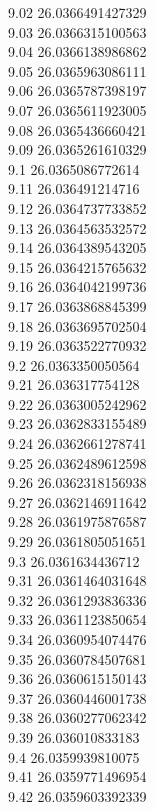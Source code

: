 {9.02	26.0366491427329\\
9.03	26.0366315100563\\
9.04	26.0366138986862\\
9.05	26.0365963086111\\
9.06	26.0365787398197\\
9.07	26.0365611923005\\
9.08	26.0365436660421\\
9.09	26.0365261610329\\
9.1	26.0365086772614\\
9.11	26.036491214716\\
9.12	26.0364737733852\\
9.13	26.0364563532572\\
9.14	26.0364389543205\\
9.15	26.0364215765632\\
9.16	26.0364042199736\\
9.17	26.0363868845399\\
9.18	26.0363695702504\\
9.19	26.0363522770932\\
9.2	26.0363350050564\\
9.21	26.036317754128\\
9.22	26.0363005242962\\
9.23	26.0362833155489\\
9.24	26.0362661278741\\
9.25	26.0362489612598\\
9.26	26.0362318156938\\
9.27	26.0362146911642\\
9.28	26.0361975876587\\
9.29	26.0361805051651\\
9.3	26.0361634436712\\
9.31	26.0361464031648\\
9.32	26.0361293836336\\
9.33	26.0361123850654\\
9.34	26.0360954074476\\
9.35	26.0360784507681\\
9.36	26.0360615150143\\
9.37	26.0360446001738\\
9.38	26.0360277062342\\
9.39	26.036010833183\\
9.4	26.0359939810075\\
9.41	26.0359771496954\\
9.42	26.0359603392339\\
}

